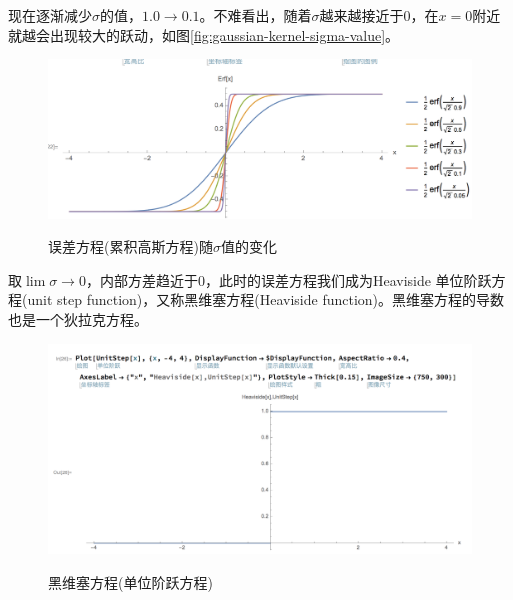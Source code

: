 \begin{subappendices}
现在逐渐减少$\sigma$的值，$1.0 \rightarrow 0.1$。不难看出，随着$\sigma$越来越接近于$0$，在$x=0$附近就越会出现较大的跃动，如图\eqref{fig:gaussian-kernel-sigma-value}。
\begin{figure}[htbp]
  \caption{误差方程(累积高斯方程)随$\sigma$值的变化}
  \centering
  \includegraphics[width=12cm]{./Figures/20180405-gaussian-sigma-value}
  \label{fig:gaussian-kernel-sigma-value}
%
\end{figure}

取$\lim \sigma \rightarrow 0$，内部方差趋近于$0$，此时的误差方程我们成为Heaviside 单位阶跃方程(unit step function)，又称黑维塞方程(Heaviside function)。黑维塞方程的导数也是一个狄拉克方程。

\begin{figure}[htbp]
  \caption{黑维塞方程(单位阶跃方程)}
  \centering
  \includegraphics[width=12cm]{./Figures/20180405-heaviside-unit-step-function}
  \label{fig:heaviside-unite-step-function}
%
\end{figure}


\end{subappendices}
